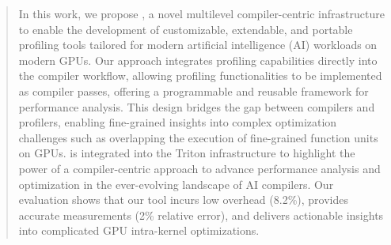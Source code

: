 \begin{abstract}
In this work, we propose \thiswork{}, a novel multilevel compiler-centric infrastructure to enable the development of customizable, extendable, and portable profiling tools tailored for modern artificial intelligence (AI) workloads on modern GPUs. 
Our approach integrates profiling capabilities directly into the compiler workflow, allowing profiling functionalities to be implemented as compiler passes, offering a programmable and reusable framework for performance analysis. 
This design bridges the gap between compilers and profilers, enabling fine-grained insights into complex optimization challenges such as overlapping the execution of fine-grained function units on GPUs.
\thiswork{} is integrated into the Triton infrastructure to highlight the power of a compiler-centric approach to advance performance analysis and optimization in the ever-evolving landscape of AI compilers.
Our evaluation shows that our tool incurs low overhead (8.2\%), provides accurate measurements (2\% relative error), and delivers actionable insights into complicated GPU intra-kernel optimizations.
\end{abstract}
